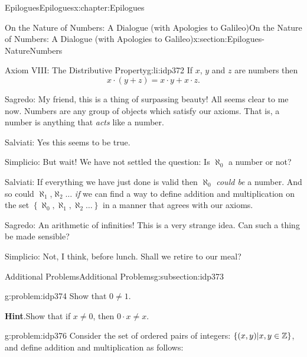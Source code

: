 \begin{chapterptx}{Epilogues}{}{Epilogues}{}{}{x:chapter:Epilogues}
\begin{sectionptx}{On the Nature of Numbers: A Dialogue (with Apologies to Galileo)}{}{On the Nature of Numbers: A Dialogue (with Apologies to Galileo)}{}{}{x:section:Epilogues-NatureNumbers}
\begin{introduction}{}
\begin{descriptionlist}
				\begin{dlimedium}{Axiom VIII: The Distributive Property}{g:li:idp372}%
					If \(x\), \(y\) and \(z\) are numbers then%
					\begin{equation*}
						x\cdot(y+z) = x\cdot y+x\cdot z\text{.}
					\end{equation*}
				\end{dlimedium}%
			\end{descriptionlist}
			\par
			\alert{Sagredo}: My friend, this is a thing of surpassing beauty! All seems clear to me now. Numbers are any group of objects which satisfy our axioms. That is, a number is anything that \emph{acts} like a number.%
			\par
			\alert{Salviati}:  Yes this seems to be true.%
			\par
			\alert{Simplicio}:  But wait! We have not settled the question: Is \(\aleph_0\) a number or not?%
			\par
			\alert{Salviati}:  If everything we have just done is valid then \(\aleph_0\) \emph{could be} a number. And so could \(\aleph_1\),\(\aleph_2 \ldots\) \emph{if} we can find a way to define addition and multiplication on the set \(\left\{\aleph_0, \aleph_1, \aleph_2 \ldots\right\}\) in a manner that agrees with our axioms.%
			\par
			\alert{Sagredo}:  An arithmetic of infinities! This is a very strange idea. Can such a thing be made sensible?%
			\par
			\alert{Simplicio}:  Not, I think, before lunch. Shall we retire to our meal?%
		\end{introduction}%
		\typeout{************************************************}
		\typeout{************************************************}
		\begin{subsectionptx}{Additional Problems}{}{Additional Problems}{}{}{g:subsection:idp373}
			\begin{problem}{}{g:problem:idp374}%
				Show that \(0\neq 1\).%
				\par\smallskip%
				\noindent\textbf{\blocktitlefont Hint}.\hypertarget{g:hint:idp375}{}\quad{}Show that if \(x\neq0\), then \(0\cdot x \neq x\).%
			\end{problem}
			\begin{problem}{}{g:problem:idp376}%
				Consider the set of ordered pairs of integers: \(\left\{(x,y)|x, y \in \mathbb {Z}\right\}\), and define addition and multiplication as follows:%

\end{problem}
\end{subsectionptx}
\end{sectionptx}
\end{chapterptx}
